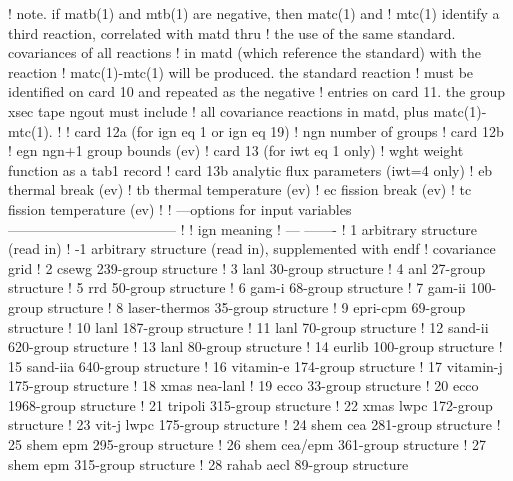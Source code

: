 \begin{ccode}
   !  note.  if matb(1) and mtb(1) are negative, then matc(1) and
   !    mtc(1) identify a third reaction, correlated with matd thru
   !    the use of the same standard.  covariances of all reactions
   !    in matd (which reference the standard) with the reaction
   !    matc(1)-mtc(1) will be produced.  the standard reaction
   !    must be identified on card 10 and repeated as the negative
   !    entries on card 11.  the group xsec tape ngout must include
   !    all covariance reactions in matd, plus matc(1)-mtc(1).
   !
   !  card 12a (for ign eq 1 or ign eq 19)
   !    ngn     number of groups
   !  card 12b
   !    egn     ngn+1 group bounds (ev)
   !  card 13 (for iwt eq 1 only)
   !    wght    weight function as a tab1 record
   !  card 13b  analytic flux parameters (iwt=4 only)
   !    eb      thermal break (ev)
   !    tb      thermal temperature (ev)
   !    ec      fission break (ev)
   !    tc      fission temperature (ev)
   !
   ! ---options for input variables------------------------------------
   !
   !      ign          meaning
   !      ---          -------
   !       1           arbitrary structure (read in)
   !      -1           arbitrary structure (read in), supplemented with endf
   !                   covariance grid
   !       2           csewg 239-group structure
   !       3           lanl 30-group structure
   !       4           anl 27-group structure
   !       5           rrd 50-group structure
   !       6           gam-i 68-group structure
   !       7           gam-ii 100-group structure
   !       8           laser-thermos 35-group structure
   !       9           epri-cpm 69-group structure
   !      10           lanl 187-group structure
   !      11           lanl 70-group structure
   !      12           sand-ii 620-group structure
   !      13           lanl 80-group structure
   !      14           eurlib 100-group structure
   !      15           sand-iia 640-group structure
   !      16           vitamin-e 174-group structure
   !      17           vitamin-j 175-group structure
   !      18           xmas nea-lanl
   !      19           ecco  33-group structure
   !      20           ecco 1968-group structure
   !      21           tripoli 315-group structure
   !      22           xmas lwpc 172-group structure
   !      23           vit-j lwpc 175-group structure
   !      24           shem cea 281-group structure
   !      25           shem epm 295-group structure
   !      26           shem cea/epm 361-group structure
   !      27           shem epm 315-group structure
   !      28           rahab aecl 89-group structure

\end{ccode}

